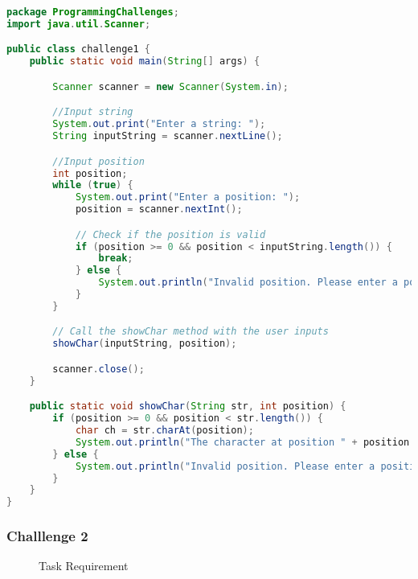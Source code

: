 \documentclass{article}
\begin{document}
\begin{lstlisting}[language=Java, caption=Challenge1.java]
package ProgrammingChallenges;
import java.util.Scanner;

public class challenge1 {
    public static void main(String[] args) {

        Scanner scanner = new Scanner(System.in);

        //Input string
        System.out.print("Enter a string: ");
        String inputString = scanner.nextLine();

        //Input position
        int position;
        while (true) {
            System.out.print("Enter a position: ");
            position = scanner.nextInt();

            // Check if the position is valid
            if (position >= 0 && position < inputString.length()) {
                break;
            } else {
                System.out.println("Invalid position. Please enter a position between 0 and " + (inputString.length() - 1));
            }
        }

        // Call the showChar method with the user inputs
        showChar(inputString, position);

        scanner.close();
    }

    public static void showChar(String str, int position) {
        if (position >= 0 && position < str.length()) {
            char ch = str.charAt(position);
            System.out.println("The character at position " + position + " is " + ch);
        } else {
            System.out.println("Invalid position. Please enter a position between 0 and " + (str.length() - 1));
        }
    }
}
\end{lstlisting}

\subsubsection*{Challlenge 2}

\begin{figure}[h]
    \centering
    \caption{Task Requirement}
\end{figure}
\end{document}
